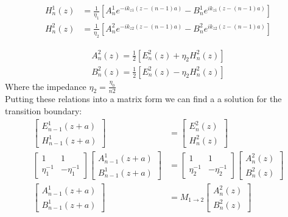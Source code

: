 \begin{equation}
	\begin{aligned}
		H^1_n(z) &=\frac{1}{\eta_1}[A^1_n e^{-ik_{z1}(z-(n-1)a)} - B^1_n e^{ik_{z1}(z-(n-1)a)}]\\
		H^2_n(z) &= \frac{1}{\eta_2}[A^2_n e^{-ik_{z2}(z-(n-1)a)} - B^2_n e^{ik_{z2}(z-(n-1)a)}]
	\end{aligned}
\end{equation}

\begin{equation}
	\begin{aligned}
			A^2_n(z) = \frac{1}{2}[E^2_n(z) + \eta_2 H^2_n(z)]\\
			B^2_n(z) = \frac{1}{2}[E^2_n(z) - \eta_2 H^2_n(z)]
	\end{aligned}
\end{equation}
Where the impedance $\eta_2 = \frac{\eta_0}{n2}$ \\
Putting these relations into a matrix form we can find a a solution for the transition boundary:
\begin{equation*}
	\begin{aligned}
		\begin{bmatrix}E^1_{n-1}(z+a)\\H^1_{n-1}(z+a) \end{bmatrix} 
		&= \begin{bmatrix}E^2_n(z)\\H^2_n(z) \end{bmatrix}\\
		 \begin{bmatrix}1 & 1\\\eta_1^{-1} & -\eta_1^{-1}\end{bmatrix}\begin{bmatrix}A^1_{n-1}(z+a)\\B^1_{n-1}(z+a) \end{bmatrix}
		 &=\begin{bmatrix}1 & 1\\\eta_2^{-1} & -\eta_2^{-1}\end{bmatrix}\begin{bmatrix}A^2_n(z)\\B^2_n(z) \end{bmatrix} \\
		\begin{bmatrix}A^1_{n-1}(z+a)\\B^1_{n-1}(z+a) \end{bmatrix}
		&= M_{1\rightarrow2}\begin{bmatrix}A^2_n(z)\\B^2_n(z) \end{bmatrix}\\
	\end{aligned}
\end{equation*}

